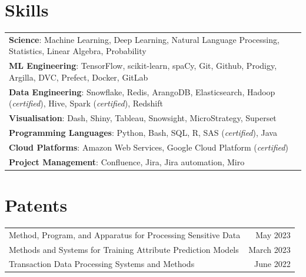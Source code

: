 \documentclass[letterpaper,11pt]{article}
\begin{document}
\section{Skills}
\begin{tabular*}{\textwidth}{l@{\extracolsep{\fill}}r}
 \textbf{\small Science}{\small: Machine Learning, Deep Learning, Natural Language Processing, Statistics, Linear Algebra, Probability}\\
 \textbf{\small ML Engineering}{\small: TensorFlow, scikit-learn, spaCy, Git, Github, Prodigy, Argilla, DVC, Prefect, Docker, GitLab}\\
 \textbf{\small Data Engineering}{\small: Snowflake, Redis, ArangoDB, Elasticsearch, Hadoop (\emph{certified}), Hive, Spark (\emph{certified}), Redshift} \\
 \textbf{\small Visualisation}{\small: Dash, Shiny, Tableau, Snowsight, MicroStrategy, Superset} \\
 \textbf{\small Programming Languages}{\small: Python, Bash, SQL, R, SAS (\emph{certified}), Java} \\
 \textbf{\small Cloud Platforms}{\small: Amazon Web Services, Google Cloud Platform (\emph{certified})}\\
 \textbf{\small Project Management}{\small: Confluence, Jira, Jira automation, Miro}\\
\end{tabular*}

\section{Patents}
\begin{tabular*}{\textwidth}{l@{\extracolsep{\fill}}r}
{\small Method, Program, and Apparatus for Processing Sensitive Data} & {\small May 2023}\\
{\small Methods and Systems for Training Attribute Prediction Models} & {\small March 2023}\\
{\small Transaction Data Processing Systems and Methods} & {\small June 2022}\\
\end{tabular*}

\end{document}
